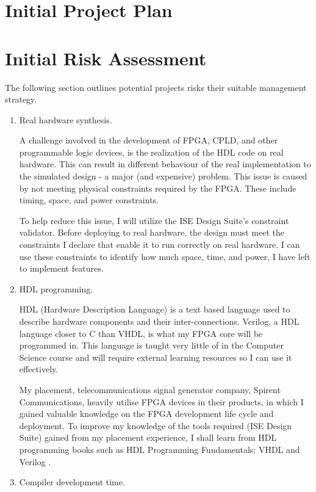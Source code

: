 \documentclass[11pt,a4paper]{article}
\begin{document}
\section{Initial Project Plan}\label{sect:plan}

\section{Initial Risk Assessment}
The following section outlines potential projects risks their suitable management strategy.

\begin{enumerate}
\item{
Real hardware synthesis. 

A challenge involved in the development of FPGA, CPLD, and other programmable logic devices, is the realization of the HDL code on real hardware. This can result in different behaviour of the real implementation to the simulated design - a major (and expensive) problem. This issue is caused by not meeting physical constraints required by the FPGA. These include timing, space, and power constraints.

To help reduce this issue, I will utilize the ISE Design Suite's constraint validator. Before deploying to real hardware, the design must meet the constraints I declare that enable it to run correctly on real hardware. I can use these constraints to identify how much space, time, and power, I have left to implement features.
}
\item{
HDL programming. 

HDL (Hardware Description Language) is a text based language used to describe hardware components and their inter-connections. Verilog, a HDL language closer to C than VHDL, is what my FPGA core will be programmed in. This language is taught very little of in the Computer Science course and will require external learning resources so I can use it effectively. 

My placement,  telecommunications signal generator company, Spirent Communications, heavily utilise FPGA devices in their products, in which I gained valuable knowledge on the FPGA development life cycle and deployment. To improve my knowledge of the tools required (ISE Design Suite) gained from my placement experience, I shall learn from HDL programming books such as HDL Programming Fundamentals: VHDL and Verilog \citep{hdl}.
}

\item{Compiler development time. 

}
\end{enumerate}
\end{document}
